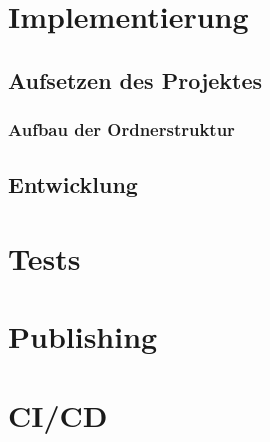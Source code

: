 \section{Implementierung}
\label{sec:EntwicklungVsCode_Implementierung}

\subsection{Aufsetzen des Projektes}

\subsubsection{Aufbau der Ordnerstruktur}

\subsection{Entwicklung}

\section{Tests}
\label{sec:EntwicklungVsCode_Tests}

\section{Publishing}
\label{sec:EntwicklungVsCode_Publishing}

\section{CI/CD}
\label{sec:EntwicklungVsCode_CICD}